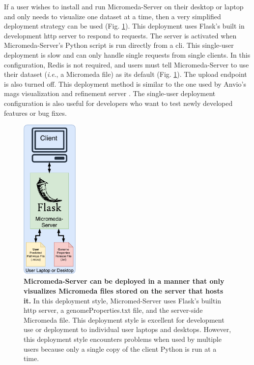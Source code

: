 If a user wishes to install and run Micromeda-Server on their desktop or laptop 
and only needs to visualize one dataset at a time, then a very simplified 
deployment strategy can be used (Fig. \ref{fig:micromeda-small-deploy}). This 
deployment uses Flask's built in development \gls{http} server to respond to 
requests. The server is activated when Micromeda-Server's Python script is run 
directly from a \gls{cli}. This single-user deployment is slow and can only 
handle single requests from single clients. In this configuration, Redis is not 
required, and users must tell Micromeda-Server to use their dataset (\textit{i}.\textit{e}., a 
Micromeda file) as its default (Fig. \ref{fig:micromeda-small-deploy}). The 
upload endpoint is also turned off. This deployment method is similar to the one 
used by Anvio's \gls{mags} visualization and refinement server 
\cite{eren2015anvi}. The single-user deployment configuration is also useful for 
developers who want to test newly developed features or bug fixes.

\begin{figure}[!ht]
  \centering
	\includegraphics[width=0.25\textwidth]{media/micromeda-simple-deployment.pdf}
	 \caption[Micromeda-Server can be deployed in a manner that only visualizes 
Micromeda files stored on the server that hosts it.]{\textbf{Micromeda-Server 
can be deployed in a manner that only visualizes Micromeda files stored on the 
server that hosts it.} In this deployment style, Micromed-Server uses Flask's 
builtin \gls{http} server, a genomeProperties.txt file, and the server-side 
Micromeda file. This deployment style is excellent for development use or 
deployment to individual user laptops and desktops. However, this deployment 
style encounters problems when used by multiple users because only a single copy 
of the client Python is run at a time.}
	 \label{fig:micromeda-small-deploy}
\end{figure}

